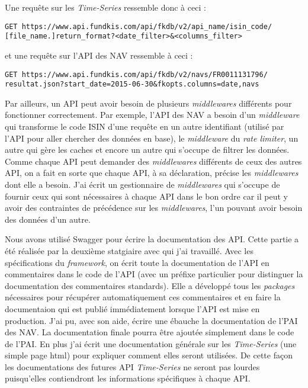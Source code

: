 \vspace{3mm}

Une requête sur les \textit{Time-Series} ressemble donc à ceci :

\vspace{3mm}

\noindent
{\color{blue}
\texttt{GET https://www.api.fundkis.com/api/fkdb/v2/{api\_name}/{isin\_code}/} \\
\texttt{[{file\_name}.]{return\_format}?<date\_filter>\&<columns\_filter>}
}

\vspace{3mm}

et une requête sur l'API des NAV ressemble à ceci :

\vspace{3mm}

\noindent
{\color{blue}
\texttt{GET https://www.api.fundkis.com/api/fkdb/v2/navs/FR0011131796/} \\
\texttt{resultat.json?start\_date=2015-06-30\&fkopts.columns=date,navs}
}


\vspace{3mm}
Par ailleurs, un API peut avoir besoin de plusieurs \textit{middlewares} différents pour fonctionner correctement. Par exemple, l'API des NAV a besoin d'un \textit{middleware} qui transforme le code ISIN d'une requête en un autre identifiant (utilisé par l'API pour aller chercher des données en base), le \textit{middleware} du \textit{rate limiter}, un autre qui gère les caches et encore un autre qui s'occupe de filtrer les données. Comme chaque API peut demander des \textit{middlewares} différents de ceux des autres API, on a fait en sorte que chaque API, à sa déclaration, précise les \textit{middlewares} dont elle a besoin. J'ai écrit un gestionnaire de \textit{middlewares} qui s'occupe de fournir ceux qui sont nécessaires à chaque API dans le bon ordre car il peut y avoir des contraintes de précédence sur les \textit{middlewares}, l'un pouvant avoir besoin des données d'un autre.

\vspace{3mm}

Nous avons utilisé Swagger pour écrire la documentation des API. Cette partie a été réalisée par la deuxième statgiaire avec qui j'ai travaillé. Avec les spécifications du \textit{framework}, on écrit toute la documentation de l'API en commentaires dans le code de l'API (avec un préfixe particulier pour distinguer la documentation des commentaires standards). Elle a développé tous les \textit{packages} nécessaires pour récupérer automatiquement ces commentaires et en faire la documentaion qui est publié immédiatement lorsque l'API est mise en production. J'ai pu, avec son aide, écrire une ébauche la documentation de l'PAI des NAV. La documentation finale pourra être ajoutée simplement dans le code de l'PAI. En plus j'ai écrit une documentation générale sur les \textit{Time-Series} (une simple page html) pour expliquer comment elles seront utilisées. De cette façon les documentations des futures API \textit{Time-Series} ne seront pas lourdes puisqu'elles contiendront les informations spécifiques à chaque API.
